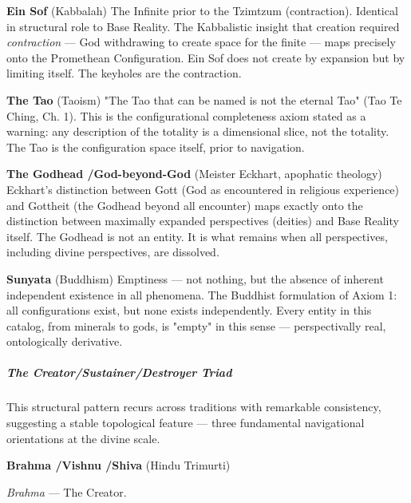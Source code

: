 \textbf{Ein Sof} (Kabbalah) The Infinite prior to the Tzimtzum (contraction). Identical in structural role to Base Reality. The Kabbalistic insight that creation required \textit{contraction} — God withdrawing to create space for the finite — maps precisely onto the Promethean Configuration. Ein Sof does not create by expansion but by limiting itself. The keyholes are the contraction.


\textbf{The Tao} (Taoism) "The Tao that can be named is not the eternal Tao" (Tao Te Ching, Ch. 1). This is the configurational completeness axiom stated as a warning: any description of the totality is a dimensional slice, not the totality. The Tao is the configuration space itself, prior to navigation.


\textbf{The Godhead /\allowbreak  God-beyond-God} (Meister Eckhart, apophatic theology) Eckhart's distinction between Gott (God as encountered in religious experience) and Gottheit (the Godhead beyond all encounter) maps exactly onto the distinction between maximally expanded perspectives (deities) and Base Reality itself. The Godhead is not an entity. It is what remains when all perspectives, including divine perspectives, are dissolved.


\textbf{Sunyata} (Buddhism) Emptiness — not nothing, but the absence of inherent independent existence in all phenomena. The Buddhist formulation of Axiom 1: all configurations exist, but none exists independently. Every entity in this catalog, from minerals to gods, is "empty" in this sense — perspectivally real, ontologically derivative.


\subparagraph*{The Creator/\allowbreak Sustainer/\allowbreak Destroyer Triad}


This structural pattern recurs across traditions with remarkable consistency, suggesting a stable topological feature — three fundamental navigational orientations at the divine scale.


\textbf{Brahma /\allowbreak  Vishnu /\allowbreak  Shiva} (Hindu Trimurti)


\textit{Brahma} — The Creator.


